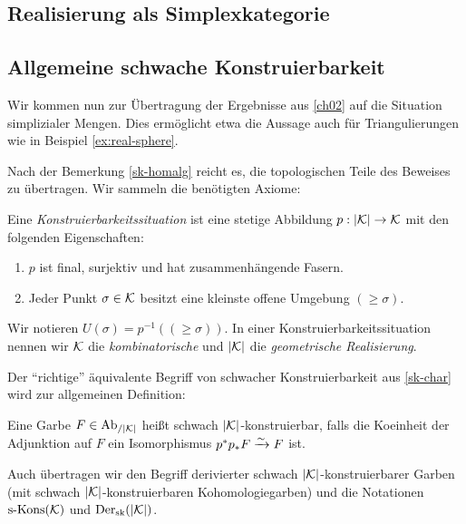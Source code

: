 \subsection{Realisierung als Simplexkategorie}
\label{sec:real-simplex-cat}

\subsection{Allgemeine schwache Konstruierbarkeit}

Wir kommen nun zur Übertragung der Ergebnisse aus \ref{ch02} auf die
Situation simplizialer Mengen. Dies ermöglicht etwa die Aussage auch
für Triangulierungen wie in Beispiel \ref{ex:real-sphere}.

Nach der Bemerkung \ref{sk-homalg} reicht es, die topologischen Teile
des Beweises zu übertragen. Wir sammeln die benötigten Axiome:
\begin{defn} \label{def:constr}
  Eine \emph{Konstruierbarkeitssituation} ist eine stetige Abbildung
  $p: |\mathcal{K}| \to \mathcal{K}$ mit den folgenden Eigenschaften:
  \begin{enumerate}
  \item \label{itm:constr-final} $p$ ist final, surjektiv und hat
    zusammenhängende Fasern.
  \item \label{itm:constr-comb-space} Jeder Punkt $\sigma \in \mathcal{K}$
    besitzt eine kleinste offene Umgebung $(\geq \sigma)$.
  \end{enumerate}
\end{defn}
Wir notieren $U(\sigma) = p^{-1}((\geq \sigma))$. In einer
Konstruierbarkeitssituation nennen wir $\mathcal{K}$ die \emph{kombinatorische}
und $|\mathcal{K}|$ die \emph{geometrische Realisierung}.

Der ``richtige'' äquivalente Begriff von schwacher Konstruierbarkeit
aus \ref{sk-char} wird zur allgemeinen Definition:
\begin{defn}
  Eine Garbe $F \in \operatorname{Ab}_{/|\mathcal{K}|}$ heißt schwach $|\mathcal{K}|$-konstruierbar, falls
  die Koeinheit der Adjunktion auf $F$ ein Isomorphismus $p^* p_* F
  \xrightarrow[]{\sim} F$ ist.
\end{defn}
Auch übertragen wir den Begriff derivierter schwach
$|\mathcal{K}|$-konstruierbarer Garben (mit schwach $|\mathcal{K}|$-konstruierbaren
Kohomologiegarben) und die Notationen $\operatorname{s-Kons}(\mathcal{K})$ und $\operatorname{Der}_{\mathrm{sk}}(|\mathcal{K}|)$.

